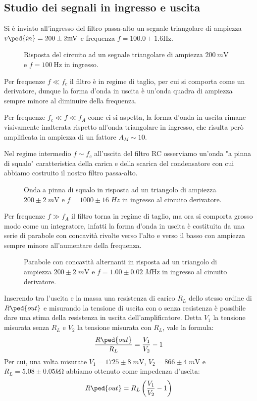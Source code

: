\documentclass[10pt,a4paper]{article}
\begin{document}
\setcounter{subsection}{2}
\subsection{Studio dei segnali in ingresso e uscita}
Si è inviato all'ingresso del filtro passa-alto un segnale triangolare di
ampiezza $v\ped{in} = 200 \pm 2 \si{m\V}$ e frequenza
$f = 100.0 \pm 1.6 \si{\Hz}$.

\begin{figure}[htbp]
\centering
\caption{Risposta del circuito ad un segnale triangolare di ampiezza
$\SI{200}{m\V}$ e $f = \SI{100}{\Hz}$ in ingresso. \label{fig: dertrg}}
\end{figure}

Per frequenze $f \ll f_c$ il filtro è in regime di taglio, per cui si comporta
come un derivatore, dunque la forma d'onda in uscita è un'onda quadra di
ampiezza sempre minore al diminuire della frequenza.

Per frequenze $f_c \ll f \ll f_A$ come ci si aspetta, la forma d'onda in uscita
rimane visivamente inalterata rispetto all'onda triangolare in ingresso,
che risulta però amplificata in ampiezza di un fattore $A_M \sim 10$.

Nel regime intermedio $f \sim f_c$ all'uscita del filtro RC osserviamo un'onda
"a pinna di squalo" caratteristica della carica e della scarica del
condensatore con cui abbiamo costruito il nostro filtro passa-alto.
\begin{figure}[htbp]
\centering
\caption{Onda a pinna di squalo in risposta ad un triangolo di ampiezza
$200 \pm 2 \; \si{m\V}$ e $f = 1000 \pm 16 \; \si{Hz}$ in ingresso al
circuito derivatore. \label{fig: derfin}}
\end{figure}

Per frequenze $f \gg f_A$ il filtro torna in regime di taglio, ma ora si
comporta grosso modo come un integratore, infatti la forma d'onda in uscita è
costituita da una serie di parabole con concavità rivolte verso l'alto e verso
il basso con ampiezza sempre minore all'aumentare della frequenza.
\begin{figure}[htbp]
\centering
\caption{Parabole con concavità alternanti in risposta ad un triangolo di
ampiezza $200 \pm 2 \; \si{m\V}$ e $f = 1.00 \pm 0.02 \; \si{M\Hz}$ in ingresso
al circuito derivatore. \label{fig: derpar}}
\end{figure}

Inserendo tra l'uscita e la massa una resistenza di carico $R_L$ dello stesso
ordine di $R\ped{out}$ e misurando la tensione di uscita con o senza
resistenza è possibile dare una stima della resistenza in uscita
dell'amplificatore.
Detta $V_1$ la tensione misurata senza $R_L$ e $V_2$ la tensione misurata
con $R_L$, vale la formula:
\begin{equation}\label{eq: Zout}
\frac{R\ped{out}}{R_L} = \frac{V_1}{V_2} -1
\end{equation}
Per cui, una volta misurate $V_1 = 1725 \pm 8 \; \si{m\V}$,
$V_2 = 866 \pm 4\; \si{m\V}$ e $R_L = 5.08 \pm 0.05 \si{k\ohm}$ abbiamo 
ottenuto come impedenza d'uscita:
\[
R\ped{out} = R_L \left(\frac{V_1}{V_2} - 1\right)
\]
\end{document}
